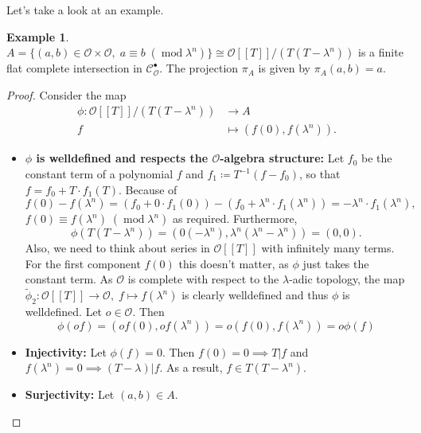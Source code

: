 \documentclass{article}
\theoremstyle{plain}%
\theoremstyle{definition}
\newtheorem{example}[theorem]{Example}
\theoremstyle{remark}
\newcommand{\cob}{\mathcal{C}_\mathcal{O}^\bullet}
\begin{document}
Let's take a look at an example.
\begin{example}\label{ex:first_1}\cite[cf.][example 1]{Darmon1995}
    \(A = \{(a,b) \in \mathcal{O}\times\mathcal{O},\; a \equiv b\; (\operatorname{mod} \lambda^n)\} 
    \cong \mathcal{O}[[T]]/(T(T-\lambda^n))\) is a finite flat complete intersection in \(\cob\).
    The projection \(\pi_A\) is given by \(\pi_A(a,b) = a\).
    \begin{proof}
        Consider the map
        \begin{align*}
            \phi\colon \mathcal{O}[[T]]/(T(T-\lambda^n)) &\to A\\
            f &\mapsto (f(0), f(\lambda^n)).
        \end{align*}
        \begin{itemize}
            \item \textbf{\(\phi\) is welldefined and respects the \(\mathcal{O}\)-algebra structure:}
                Let \(f_0\) be the constant term of a polynomial \(f\) and \(f_1 \coloneqq T^{-1}(f-f_0)\), 
                so that \(f = f_0 + T\cdot f_1(T)\). Because of
                \[
                    f(0) - f(\lambda^n) 
                    = (f_0 + 0\cdot f_1(0)) - (f_0 + \lambda^n \cdot f_1(\lambda^n)) 
                    = -\lambda^n \cdot f_1(\lambda^n),
                \]
                \(f(0) \equiv f(\lambda^n)\; (\operatorname{mod} \lambda^n)\) as required.
                Furthermore, \[\phi(T(T-\lambda^n)) = (0(-\lambda^n), \lambda^n(\lambda^n - \lambda^n)) = (0,0).\]
                Also, we need to think about series in \(\mathcal{O}[[T]]\) with infinitely many terms.
                For the first component \(f(0)\) this doesn't matter, as \(\phi\) just takes the constant term. 
                As \(\mathcal{O}\) is complete with respect to the \(\lambda\)-adic topology, 
                the map \(\tilde\phi_2\colon \mathcal{O}[[T]] \to \mathcal{O},\; f \mapsto f(\lambda^n)\) 
                is clearly welldefined and thus \(\phi\) is welldefined.
                Let \(o \in \mathcal{O}\). Then 
                \[\phi(of) = (of(0), of(\lambda^n)) = o(f(0), f(\lambda^n)) = o\phi(f)\]
            \item \textbf{Injectivity:}
                Let \(\phi(f) = 0\). Then \(f(0) = 0 \implies T | f\) and \(f(\lambda^n) = 0 \implies (T - \lambda) | f\).
                As a result, \(f \in T(T-\lambda^n)\).
            \item \textbf{Surjectivity:}
                Let \((a,b) \in A\).

\end{itemize}
\end{proof}
\end{example}
\end{document}
